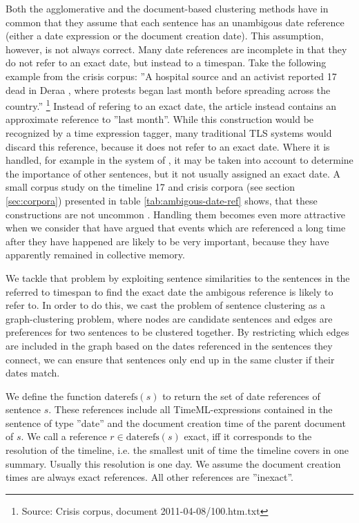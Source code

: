 \documentclass[a4paper,BCOR=10mm]{report}
\begin{document}
Both the agglomerative and the document-based clustering methods have in common that they assume that each sentence has an unambigous date reference (either a date expression or the document creation date).
This assumption, however, is not always correct. Many date references are incomplete in that they do not refer to an exact date, but instead to a timespan. Take the following example from the crisis corpus: ''A hospital source and an activist reported 17 dead in Deraa , where protests began last month before spreading across the country.'' \footnote{Source: Crisis corpus, document 2011-04-08/100.htm.txt} %
Instead of refering to an exact date, the article instead contains an approximate reference to ''last month''. While this construction would be recognized by a time expression tagger, many traditional TLS systems would discard this reference, because it does not refer to an exact date.
Where it is handled, for example in the system of \citet{chieu}, it may be taken into account to determine the importance of other sentences, but it not usually assigned an exact date.
A small corpus study on the timeline 17 and crisis corpora (see section \ref{sec:corpora}) presented in table \ref{tab:ambigous-date-ref} shows, that these constructions are not uncommon . %
Handling them becomes even more attractive when we consider that \citet{datesel-graph} have argued that events which are referenced a long time after they have happened are likely to be very important, because they have apparently remained in collective memory. %

We tackle that problem by exploiting sentence similarities to the sentences in the referred to timespan to find the exact date the ambigous reference is likely to refer to. In order to do this, we cast the problem of sentence clustering as a graph-clustering problem, where nodes are candidate sentences and edges are preferences for two sentences to be clustered together. By restricting which edges are included in the graph based on the dates referenced in the sentences they connect, we can ensure that sentences only end up in the same cluster if their dates match.

We define the function $\text{daterefs}(s)$ to return the set of date references of sentence $s$. These references include all TimeML-expressions contained in the sentence of type ''date'' and the document creation time of the parent document of $s$.
We call a reference $r \in \text{daterefs}(s)$ exact, iff it corresponds to the resolution of the timeline, i.e. the smallest unit of time the timeline covers in one summary. Usually this resolution is one day. We assume the document creation times are always exact references. All other references are ''inexact''.
\end{document}
